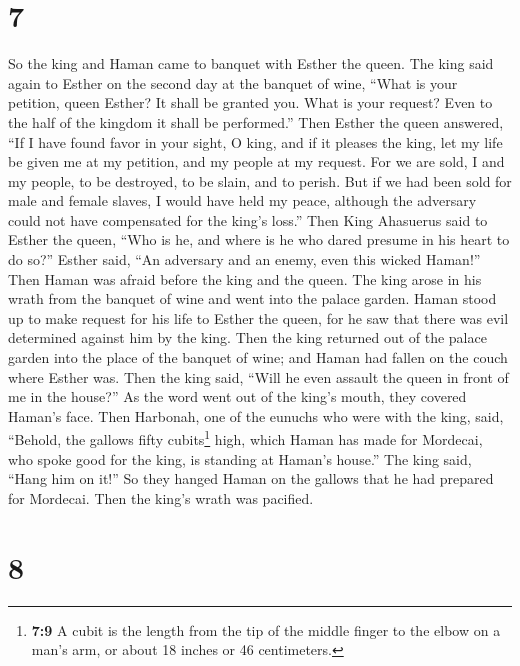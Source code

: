 \hypertarget{section-6}{%
\section{7}\label{section-6}}

 So the king and Haman came to banquet with Esther the
queen.  The king said again to Esther on the second day at
the banquet of wine, ``What is your petition, queen Esther? It shall be
granted you. What is your request? Even to the half of the kingdom it
shall be performed.''  Then Esther the queen answered,
``If I have found favor in your sight, O king, and if it pleases the
king, let my life be given me at my petition, and my people at my
request.  For we are sold, I and my people, to be
destroyed, to be slain, and to perish. But if we had been sold for male
and female slaves, I would have held my peace, although the adversary
could not have compensated for the king's loss.''  Then
King Ahasuerus said to Esther the queen, ``Who is he, and where is he
who dared presume in his heart to do so?''  Esther said,
``An adversary and an enemy, even this wicked Haman!'' Then Haman was
afraid before the king and the queen.  The king arose in
his wrath from the banquet of wine and went into the palace garden.
Haman stood up to make request for his life to Esther the queen, for he
saw that there was evil determined against him by the king.
 Then the king returned out of the palace garden into the
place of the banquet of wine; and Haman had fallen on the couch where
Esther was. Then the king said, ``Will he even assault the queen in
front of me in the house?'' As the word went out of the king's mouth,
they covered Haman's face.  Then Harbonah, one of the
eunuchs who were with the king, said, ``Behold, the gallows fifty
cubits\footnote{\textbf{7:9} A cubit is the length from the tip of the
  middle finger to the elbow on a man's arm, or about 18 inches or 46
  centimeters.} high, which Haman has made for Mordecai, who spoke good
for the king, is standing at Haman's house.'' The king said, ``Hang him
on it!''  So they hanged Haman on the gallows that he had
prepared for Mordecai. Then the king's wrath was pacified.

\hypertarget{section-7}{%
\section{8}\label{section-7}}

